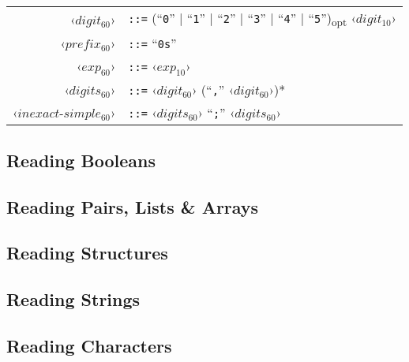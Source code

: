 \grammar
\begin{longtable}{ r l }
  ‹$digit_{60}$› & \lstinline!::=! (``\lstinline!0!'' | ``\lstinline!1!'' | ``\lstinline!2!'' | ``\lstinline!3!'' | ``\lstinline!4!'' | ``\lstinline!5!'')\textsubscript{opt} ‹$digit_{10}$› \\
  ‹$prefix_{60}$› & \lstinline!::=! ``\lstinline!0s!'' \\
  ‹$exp_{60}$› & \lstinline!::=! ‹$exp_{10}$› \\
  
  ‹$digits_{60}$› & \lstinline!::=! ‹$digit_{60}$› (``\lstinline!,!'' ‹$digit_{60}$›)* \\
  ‹$inexact$-$simple_{60}$› & \lstinline!::=! ‹$digits_{60}$› ``\lstinline!;!'' ‹$digits_{60}$› \\
\end{longtable}





\subsection{Reading Booleans}
\label{subsec:aml-base-lang-reader-booleans}





\subsection{Reading Pairs, Lists \& Arrays}
\label{subsec:aml-base-lang-reader-lists}





\subsection{Reading Structures}
\label{subsec:aml-base-lang-reader-structures}





\subsection{Reading Strings}
\label{subsec:aml-base-lang-reader-strings}





\subsection{Reading Characters}
\label{subsec:aml-base-lang-reader-characters}





